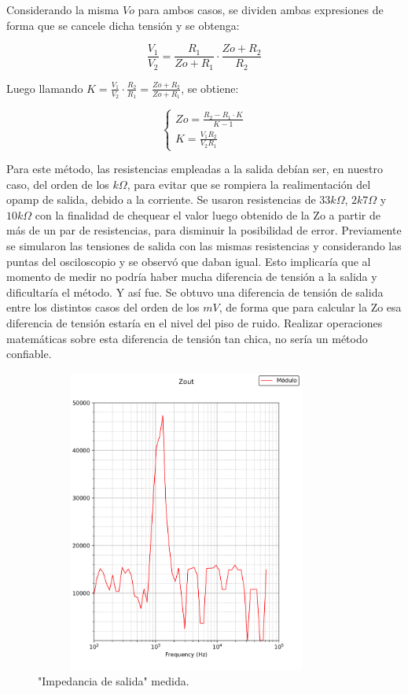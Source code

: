 Considerando la misma $Vo$ para ambos casos, se dividen ambas expresiones de forma que se cancele dicha tensi\'on y se obtenga:

\begin{equation}
\frac{V_1}{V_2} = \frac{R_1}{Zo + R_1 } \cdot \frac{Zo + R_2}{R_2}
\end{equation}

Luego llamando $K = \frac{V_1}{V_2}\cdot \frac{R_2}{R_1} = \frac{Zo + R_2}{Zo + R_1}$, se obtiene:

\begin{equation}
\begin{cases}
Zo = \frac{R_2 - R_1 \cdot K}{K - 1}\\
K=\frac{V_1 R_2}{V_2 R_1}
\end{cases}
\label{zo}
\end{equation}

Para este m\'etodo, las resistencias empleadas a la salida deb\'ian ser, en nuestro caso, del orden de los $k\Omega$, para evitar que se rompiera la realimentaci\'on del opamp de salida, debido a la corriente. Se usaron resistencias de $33k\Omega$, $2k7\Omega$ y $10k\Omega$ con la finalidad de chequear el valor luego obtenido de la Zo a partir de m\'as de un par de resistencias, para disminuir la posibilidad de error.
Previamente se simularon las tensiones de salida con las mismas resistencias y considerando las puntas del osciloscopio y se observ\'o que daban igual. Esto implicar\'ia que al momento de medir no podr\'ia haber mucha diferencia de tensi\'on a la salida y dificultar\'ia el m\'etodo. Y as\'i fue. Se obtuvo una diferencia de tensi\'on de salida entre los distintos casos del orden de los $mV$, de forma que para calcular la Zo esa diferencia de tensi\'on estar\'ia en el nivel del piso de ruido. Realizar operaciones matem\'aticas sobre esta diferencia de tensi\'on tan chica, no ser\'ia un m\'etodo confiable.

\begin{figure}[H] %
	\centering
	\includegraphics[width=10cm,height=10cm,keepaspectratio]{../EJ1/00GRAFICOS/zom.png}
	\caption{"Impedancia de salida" medida.}
	\label{zom}
\end{figure}

